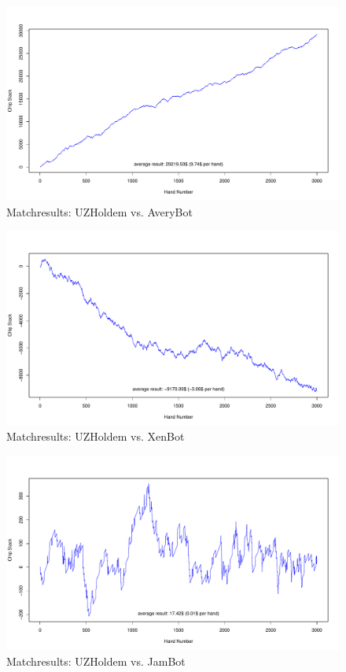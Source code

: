 \begin{figure}[!ht]
\centering
\includegraphics[width=\linewidth]{section06-implementation/figures/matchresults/AveryBot}
\caption{Matchresults: UZHoldem vs. AveryBot}
\label{fig:result-averybot}
\end{figure}

\begin{figure}[!ht]
\centering
\includegraphics[width=\linewidth]{section06-implementation/figures/matchresults/XenBot}
\caption{Matchresults: UZHoldem vs. XenBot}
\label{fig:result-xenbot}
\end{figure}

\begin{figure}[!ht]
\centering
\includegraphics[width=\linewidth]{section06-implementation/figures/matchresults/JamBot}
\caption{Matchresults: UZHoldem vs. JamBot}
\label{fig:result-jambot}
\end{figure}

